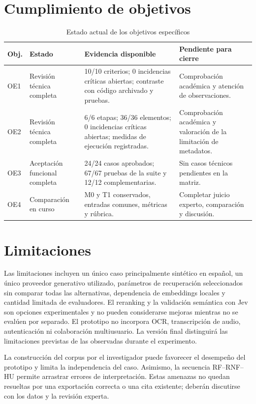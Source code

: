 \section{Cumplimiento de objetivos}

\begin{table}[H]
  \centering
  \caption{Estado actual de los objetivos específicos}
  \label{tab:estado-objetivos}
  \small
  \begin{tabularx}{\textwidth}{p{1.3cm}p{3.2cm}Yp{3.2cm}}
    \toprule
    Obj. & Estado & Evidencia disponible & Pendiente para cierre \\
    \midrule
    OE1 & Revisión técnica completa & 10/10 criterios; 0 incidencias críticas abiertas; contraste con código archivado y pruebas. & Comprobación académica y atención de observaciones. \\
    OE2 & Revisión técnica completa & 6/6 etapas; 36/36 elementos; 0 incidencias críticas abiertas; medidas de ejecución registradas. & Comprobación académica y valoración de la limitación de metadatos. \\
    OE3 & Aceptación funcional completa & 24/24 casos aprobados; 67/67 pruebas de la suite y 12/12 complementarias. & Sin casos técnicos pendientes en la matriz. \\
    OE4 & Comparación en curso & M0 y T1 conservados, entradas comunes, métricas y rúbrica. & Completar juicio experto, comparación y discusión. \\
    \bottomrule
  \end{tabularx}
\end{table}

\section{Limitaciones}

Las limitaciones incluyen un único caso principalmente sintético en español, un único proveedor generativo utilizado, parámetros de recuperación seleccionados sin comparar todas las alternativas, dependencia de embeddings locales y cantidad limitada de evaluadores. El reranking y la validación semántica con Jev son opciones experimentales y no pueden considerarse mejoras mientras no se evalúen por separado. El prototipo no incorpora OCR, transcripción de audio, autenticación ni colaboración multiusuario. La versión final distinguirá las limitaciones previstas de las observadas durante el experimento.

La construcción del corpus por el investigador puede favorecer el desempeño del prototipo y limita la independencia del caso. Asimismo, la secuencia RF--RNF--HU permite arrastrar errores de interpretación. Estas amenazas no quedan resueltas por una exportación correcta o una cita existente; deberán discutirse con los datos y la revisión experta.

